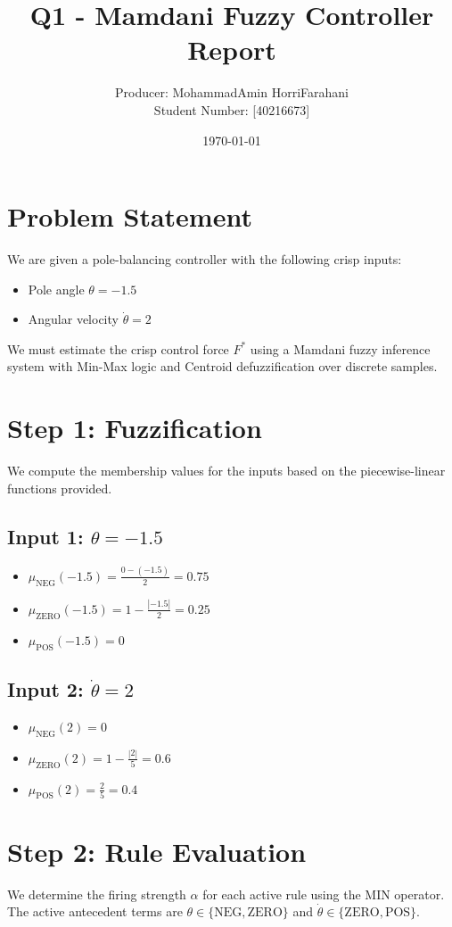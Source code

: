 \documentclass{article}
\title{Q1 - Mamdani Fuzzy Controller Report}
\author{Producer: MohammadAmin HorriFarahani \\ Student Number: [40216673]}
\date{\today}
\begin{document}
\maketitle

\section{Problem Statement}
We are given a pole-balancing controller with the following crisp inputs:
\begin{itemize}
    \item Pole angle $\theta = -1.5$
    \item Angular velocity $\dot{\theta} = 2$
\end{itemize}
We must estimate the crisp control force $F^*$ using a Mamdani fuzzy inference system with Min-Max logic and Centroid defuzzification over discrete samples.

\section{Step 1: Fuzzification}
We compute the membership values for the inputs based on the piecewise-linear functions provided.

\subsection{Input 1: $\theta = -1.5$}
\begin{itemize}
    \item $\mu_{\text{NEG}}(-1.5) = \frac{0 - (-1.5)}{2} = 0.75$
    \item $\mu_{\text{ZERO}}(-1.5) = 1 - \frac{|-1.5|}{2} = 0.25$
    \item $\mu_{\text{POS}}(-1.5) = 0$
\end{itemize}

\subsection{Input 2: $\dot{\theta} = 2$}
\begin{itemize}
    \item $\mu_{\text{NEG}}(2) = 0$
    \item $\mu_{\text{ZERO}}(2) = 1 - \frac{|2|}{5} = 0.6$
    \item $\mu_{\text{POS}}(2) = \frac{2}{5} = 0.4$
\end{itemize}

\section{Step 2: Rule Evaluation}
We determine the firing strength $\alpha$ for each active rule using the MIN operator. The active antecedent terms are $\theta \in \{\text{NEG}, \text{ZERO}\}$ and $\dot{\theta} \in \{\text{ZERO}, \text{POS}\}$.
\end{document}
